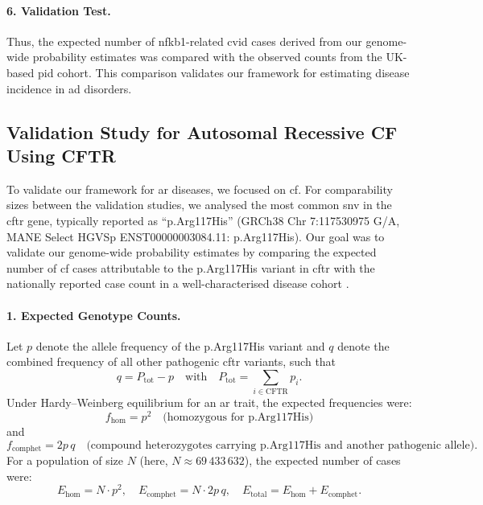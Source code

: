 \paragraph{6. Validation Test.}
Thus, the expected number of \ac{nfkb1}-related \ac{cvid} cases derived from our genome-wide probability estimates was compared with the observed counts from the UK-based \ac{pid} cohort. This comparison validates our framework for estimating disease incidence in \ac{ad} disorders.


\subsection{Validation Study for Autosomal Recessive CF Using CFTR}

To validate our framework for \ac{ar} diseases, we focused on \ac{cf}.
For comparability sizes between the validation studies, we analysed the most common \ac{snv} in the \ac{cftr} gene, typically reported as ``p.Arg117His'' (GRCh38 Chr 7:117530975 G/A, MANE Select HGVSp ENST00000003084.11: p.Arg117His).
Our goal was to validate our genome-wide probability estimates by comparing the expected number of \ac{cf} cases attributable to the p.Arg117His variant in \ac{cftr} with the nationally reported case count in a well-characterised disease cohort
\cite{naito2023uk, castellani2013cftr2, Grasemann2023cftr}.

\paragraph{1. Expected Genotype Counts.}
Let \( p \) denote the allele frequency of the p.Arg117His variant and \( q \) denote the combined frequency of all other pathogenic \ac{cftr} variants, such that
\[
q = P_{\text{tot}} - p \quad \text{with} \quad P_{\text{tot}} = \sum_{i \in \text{CFTR}} p_i.
\]
Under Hardy–Weinberg equilibrium for an \ac{ar} trait, the expected frequencies were:
\[
f_{\text{hom}} = p^2 \quad \text{(homozygous for p.Arg117His)}
\]
and
\[
f_{\text{comphet}} = 2p\,q \quad \text{(compound heterozygotes carrying p.Arg117His and another pathogenic allele)}.
\]
For a population of size \( N \) (here, \( N \approx 69\,433\,632 \)), the expected number of cases were:
\[
E_{\text{hom}} = N \cdot p^2,\quad E_{\text{comphet}} = N \cdot 2p\,q,\quad E_{\text{total}} = E_{\text{hom}} + E_{\text{comphet}}.
\]

